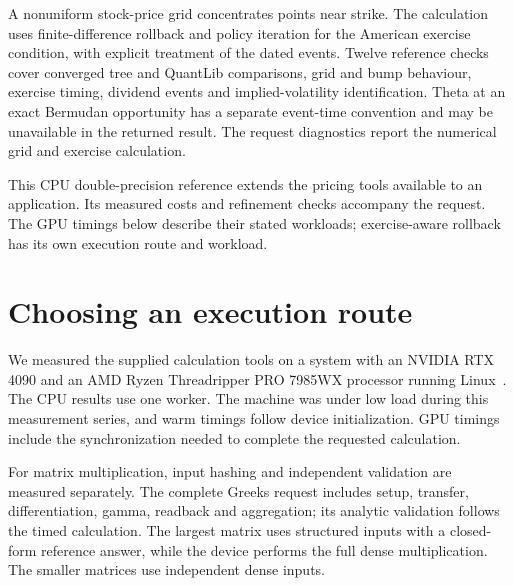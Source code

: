 \documentclass[8pt]{strategynet-journal}
\begin{document}
\begin{SNcolumns}
A nonuniform stock-price grid concentrates points near strike. The calculation
uses finite-difference rollback and policy iteration for the American exercise
condition, with explicit treatment of the dated events. Twelve reference
checks cover converged tree and QuantLib comparisons, grid and bump behaviour,
exercise timing, dividend events and implied-volatility identification.
Theta at an exact Bermudan opportunity has a separate event-time convention
and may be unavailable in the returned result. The request diagnostics report
the numerical grid and exercise calculation.

This CPU double-precision reference extends the pricing tools available to an
application. Its measured costs and refinement checks accompany the request.
The GPU timings below describe their stated workloads; exercise-aware rollback
has its own execution route and workload.

\section{Choosing an execution route}
We measured the supplied calculation tools on a system with an NVIDIA RTX 4090
and an AMD Ryzen Threadripper PRO 7985WX processor running Linux~\cite{volt}. The CPU results
use one worker. The machine was under low load during this measurement series,
and warm timings follow device initialization. GPU timings include the
synchronization needed to complete the requested calculation.

For matrix multiplication, input
hashing and independent validation are measured separately. The complete Greeks
request includes setup, transfer, differentiation, gamma, readback and
aggregation; its analytic validation follows the timed calculation. The largest
matrix uses structured inputs with a closed-form reference answer,
while the device performs the full dense multiplication. The smaller matrices
use independent dense inputs.


\end{SNcolumns}
\end{document}
